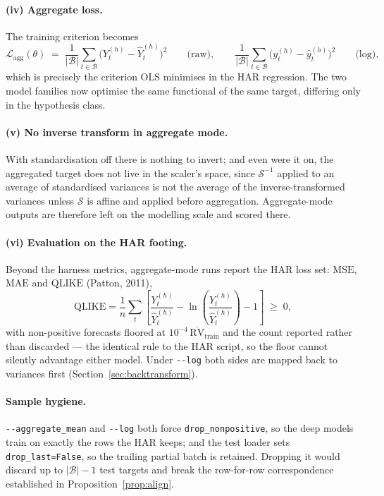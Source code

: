 \documentclass[11pt,a4paper]{article}
\newcommand{\RV}{\mathrm{RV}}
\newcommand{\MSE}{\mathrm{MSE}}
\newcommand{\MAE}{\mathrm{MAE}}
\newcommand{\QLIKE}{\mathrm{QLIKE}}
\newcommand{\Lagg}{\mathcal{L}_{\mathrm{agg}}}
\begin{document}
\paragraph{(iv) Aggregate loss.} The training criterion becomes
\begin{equation}
  \Lagg(\theta)
  \;=\;
  \frac{1}{|\mathcal{B}|}\sum_{t\in\mathcal{B}}
  \bigl(Y^{(h)}_{t}-\hat{Y}^{(h)}_{t}\bigr)^{2}
  \qquad\text{(raw)},
  \qquad
  \frac{1}{|\mathcal{B}|}\sum_{t\in\mathcal{B}}
  \bigl(y^{(h)}_{t}-\hat{y}^{(h)}_{t}\bigr)^{2}
  \qquad\text{(log)},
  \label{eq:agg-loss}
\end{equation}
which is precisely the criterion OLS minimises in the HAR regression. The two model
families now optimise the same functional of the same target, differing only in the
hypothesis class.

\paragraph{(v) No inverse transform in aggregate mode.} With standardisation off there is
nothing to invert; and even were it on, the aggregated target does not live in the
scaler's space, since $\mathcal{S}^{-1}$ applied to an average of standardised variances is
not the average of the inverse-transformed variances unless $\mathcal{S}$ is affine and
applied before aggregation. Aggregate-mode outputs are therefore left on the modelling
scale and scored there.

\paragraph{(vi) Evaluation on the HAR footing.} Beyond the harness metrics, aggregate-mode
runs report the HAR loss set: $\MSE$, $\MAE$ and $\QLIKE$ (Patton, 2011),
\begin{equation}
  \QLIKE=\frac{1}{n}\sum_{t}\left[\frac{Y^{(h)}_{t}}{\hat{Y}^{(h)}_{t}}
  -\ln\!\left(\frac{Y^{(h)}_{t}}{\hat{Y}^{(h)}_{t}}\right)-1\right]\;\ge\;0,
  \label{eq:qlike}
\end{equation}
with non-positive forecasts floored at $10^{-4}\,\overline{\RV}_{\text{train}}$ and the
count reported rather than discarded --- the identical rule to the HAR script, so the floor
cannot silently advantage either model. Under \texttt{-{}-log} both sides are mapped back to
variances first (Section~\ref{sec:backtransform}).

\paragraph{Sample hygiene.} \texttt{-{}-aggregate\_mean} and \texttt{-{}-log} both force
\texttt{drop\_nonpositive}, so the deep models train on exactly the rows the HAR keeps; and
the test loader sets \texttt{drop\_last=False}, so the trailing partial batch is retained.
Dropping it would discard up to $|\mathcal{B}|-1$ test targets and break the row-for-row
correspondence established in Proposition~\ref{prop:align}.
\end{document}

